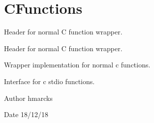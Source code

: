 \hypertarget{group__cFunctions}{}\section{C\+Functions}
\label{group__cFunctions}


Header for normal C function wrapper.  


Header for normal C function wrapper. 

Wrapper implementation for normal c functions.

Interface for c stdio functions.

\begin{DoxyAuthor}{Author}
hmarcks
\end{DoxyAuthor}
\begin{DoxyDate}{Date}
18/12/18 
\end{DoxyDate}
